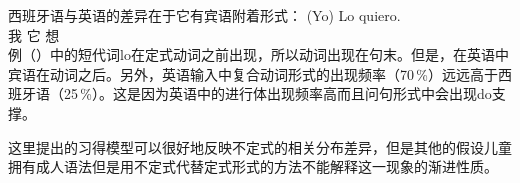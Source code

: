 西班牙语与英语的差异在于它有宾语附着形式：
\ea
\gll (Yo) Lo quiero.\\
     我 它 想\\
\z
例（）中的短代词lo在定式动词之前出现，所以动词出现在句末。但是，在英语中宾语在动词之后。另外，英语输入中复合动词形式的出现频率（70\,\%）远远高于西班牙语（25\,\%）。这是因为英语中的进行体出现频率高而且问句形式中会出现do支撑。

这里提出的习得模型可以很好地反映不定式的相关分布差异，但是其他的假设儿童拥有成人语法但是用不定式代替定式形式的方法不能解释这一现象的渐进性质。

